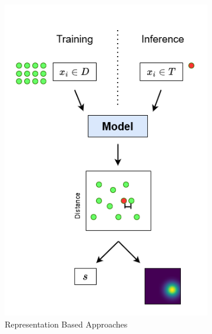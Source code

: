 \begin{figure}
    \centering
    \begin{subfigure}[b]{0.44\textwidth}
        \centering
        \includegraphics[width=\textwidth]{figures/represbased_viz.png}
        \caption{Representation Based Approaches}
        \label{subfig:repbased}
    \end{subfigure}
    \hfill
    \begin{subfigure}[b]{0.44\textwidth}
        \centering

\end{subfigure}
\end{figure}
